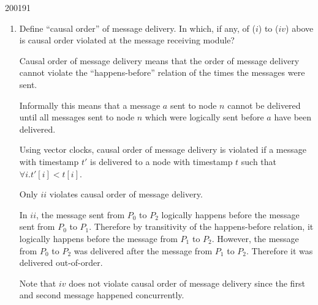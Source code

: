 \documentclass[10pt,\jkfside,a4paper]{article}
\begin{document}
\begin{examquestion}{2001}{9}{1}
\begin{enumerate}[label=(\alph*)]
\item Define ``causal order'' of message delivery. In which, if any, of
($i$) to ($iv$) above is causal order violated at the message receiving module?

Causal order of message delivery means that the order of message delivery
cannot violate the ``happens-before'' relation of the times the messages
were sent.

Informally this means that a message $a$ sent to node $n$ cannot be delivered
until all messages sent to node $n$ which were logically sent before $a$ have
been delivered.

Using vector clocks, causal order of message delivery is violated if a
message with timestamp $t'$ is delivered to a node with timestamp $t$ such
that $\forall i. t'[i] < t[i]$.

Only $ii$ violates causal order of message delivery.

In $ii$, the message sent from $P_0$ to $P_2$ logically happens before the
message sent from $P_0$ to $P_1$. Therefore by transitivity of the
happens-before relation, it logically happens before the message from $P_1$
to $P_2$. However, the message from $P_0$ to $P_2$ was delivered after the
message from $P_1$ to $P_2$. Therefore it was delivered out-of-order.

Note that $iv$ does not violate causal order of message delivery since the
first and second message happened concurrently.

\end{enumerate}

\end{examquestion}
\end{document}
